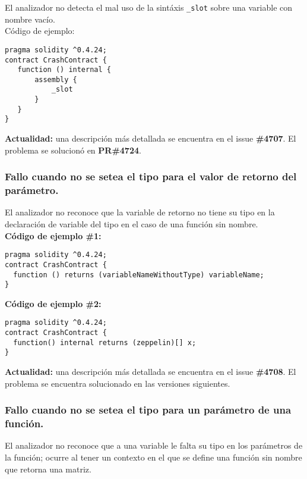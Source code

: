 El analizador no detecta el mal uso de la sintáxis \texttt{\_slot} sobre una variable con nombre vacío.\\

Código de ejemplo:
\begin{lstlisting}[language=Solidity]
pragma solidity ^0.4.24;
contract CrashContract {
   function () internal {
       assembly {
           _slot
       }
   }
}
\end{lstlisting}

\textbf{Actualidad:} una descripción más detallada se encuentra en el issue \textbf{\#4707}\cite{GHI4707}. El problema se solucionó en \textbf{PR\#4724}\cite{GHPR4724}.\\

\subsubsection{Fallo cuando no se setea el tipo para el valor de retorno del parámetro.}

El analizador no reconoce que la variable de retorno no tiene su tipo en la declaración de variable del tipo en el caso de una función sin nombre.\\

\textbf{Código de ejemplo \#1:}
\begin{lstlisting}[language=Solidity]
pragma solidity ^0.4.24;
contract CrashContract {
  function () returns (variableNameWithoutType) variableName;
}
\end{lstlisting}
\textbf{
Código de ejemplo \#2:}
\begin{lstlisting}[language=Solidity]
pragma solidity ^0.4.24;
contract CrashContract {
  function() internal returns (zeppelin)[] x;
}
\end{lstlisting}

\textbf{Actualidad:} una descripción más detallada se encuentra en el issue \textbf{\#4708}\cite{GHI4708}. El problema se encuentra solucionado en las versiones siguientes. \\

\subsubsection{Fallo cuando no se setea el tipo para un parámetro de una función.}

El analizador no reconoce que a una variable le falta su tipo en los parámetros de la función; ocurre al tener un contexto en el que se define una función sin nombre que retorna una matriz.\\

